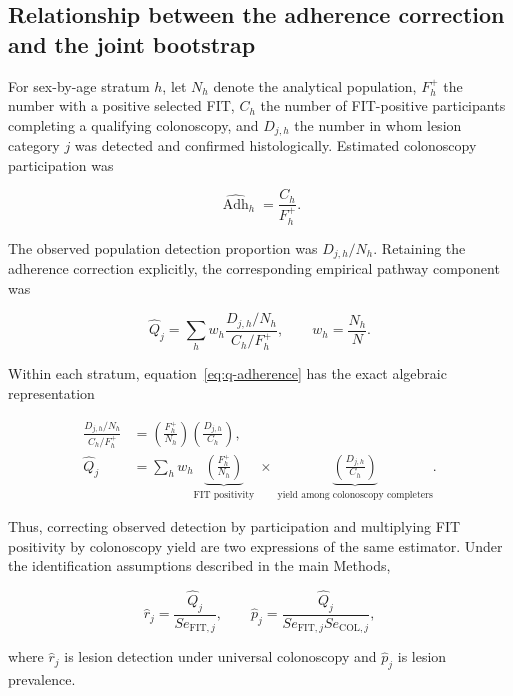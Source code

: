 \documentclass[10pt,a4paper]{article}
\newcommand{\Se}{\mathit{Se}}
\newcommand{\Adh}{\operatorname{Adh}}
\begin{document}
\subsection*{Relationship between the adherence correction and the joint
bootstrap}

For sex-by-age stratum $h$, let $N_h$ denote the analytical population,
$F_h^+$ the number with a positive selected FIT, $C_h$ the number of
FIT-positive participants completing a qualifying colonoscopy, and $D_{j,h}$
the number in whom lesion category $j$ was detected and confirmed
histologically. Estimated colonoscopy participation was

\begin{equation*}
\widehat{\Adh}_h=\frac{C_h}{F_h^+}.
\end{equation*}

The observed population detection proportion was $D_{j,h}/N_h$. Retaining the
adherence correction explicitly, the corresponding empirical pathway
component was

\begin{equation}
\widehat Q_j
=
\sum_h w_h
\frac{D_{j,h}/N_h}{C_h/F_h^+},
\qquad
w_h=\frac{N_h}{N}.
\label{eq:q-adherence}
\end{equation}

Within each stratum, equation~\eqref{eq:q-adherence} has the exact algebraic
representation

\begin{align}
\frac{D_{j,h}/N_h}{C_h/F_h^+}
&=
\left(\frac{F_h^+}{N_h}\right)
\left(\frac{D_{j,h}}{C_h}\right),
\\
\widehat Q_j
&=
\sum_h w_h
\underbrace{\left(\frac{F_h^+}{N_h}\right)}_{\text{FIT positivity}}
\;\times\;
\underbrace{\left(\frac{D_{j,h}}{C_h}\right)}_{\text{yield among colonoscopy completers}}.
\label{eq:q-yield}
\end{align}

Thus, correcting observed detection by participation and multiplying FIT
positivity by colonoscopy yield are two expressions of the same estimator.
Under the identification assumptions described in the main Methods,

\begin{equation*}
\widehat r_j
=\frac{\widehat Q_j}{\Se_{\mathrm{FIT},j}},
\qquad
\widehat p_j
=\frac{\widehat Q_j}
{\Se_{\mathrm{FIT},j}\Se_{\mathrm{COL},j}},
\end{equation*}

where $\widehat r_j$ is lesion detection under universal colonoscopy and
$\widehat p_j$ is lesion prevalence.
\end{document}

